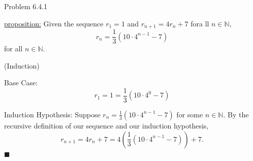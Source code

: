 \documentclass{article}
\theoremstyle{definition}
\newcommand{\N}{\mathbb{N}}
\begin{document}
	\noindent Problem 6.4.1  \vspace{0.3cm}

	\underline{proposition:} Given the sequence $r_1=1$ and $r_{n+1}=4r_n+7$ fora ll $n\in \N$, $$r_n=\frac{1}{3}(10\cdot 4^{n-1}-7)$$ for all $n\in\N.$
	\vspace{0.2cm}

	 (Induction)

	Base Case: $$r_1=1=\frac{1}{3}(10\cdot 4^0-7)$$

	Induction Hypothesis: Suppose $r_n=\frac{1}{3}(10\cdot 4^{n-1}-7)$ for some $n\in\N.$ By the recursive definition of our sequence and our induction hypothesis,  $$r_{n+1}=4r_n+7=4\left(\frac{1}{3}(10\cdot 4^{n-1}-7)\right)+7.$$  $\blacksquare$
	\vspace{1cm}
\end{document}
